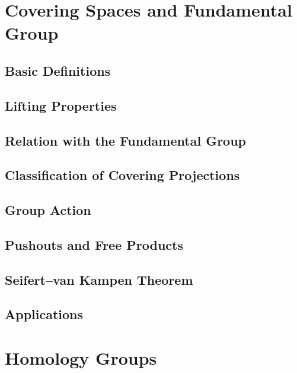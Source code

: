 \documentclass[11pt, a4paper]{article}
\begin{document}
\section{Covering Spaces and Fundamental Group}

\subsection{Basic Definitions}

\subsection{Lifting Properties}

\subsection{Relation with the Fundamental Group}

\subsection{Classification of Covering Projections}

\subsection{Group Action}

\subsection{Pushouts and Free Products}

\subsection{Seifert--van Kampen Theorem}

\subsection{Applications}

\section{Homology Groups}
\end{document}
